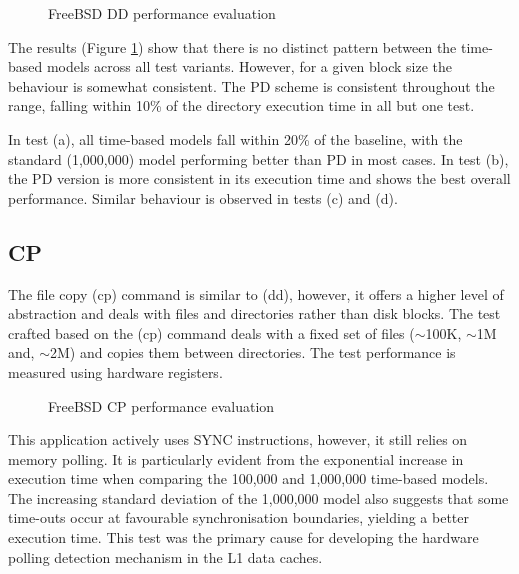 		\begin{figure}[!t]
		\centering 
			\caption{FreeBSD DD performance evaluation} 
			\label{dd_freebsd_full}
		\end{figure}
		
		The results (Figure \ref{dd_freebsd_full}) show that there is no distinct pattern between the time-based models across all test variants. However, for a given block size the behaviour is somewhat consistent. The PD scheme is consistent throughout the range, falling within 10\% of the directory execution time in all but one test.
		
		In test (a), all time-based models fall within 20\% of the baseline, with the standard (1,000,000) model performing better than PD in most cases. In test (b), the PD version is more consistent in its execution time and shows the best overall performance. Similar behaviour is observed in tests (c) and (d). 



	\subsection{CP}
		\label{results_cp}
		The file copy (cp) command is similar to (dd), however, it offers a higher level of abstraction and deals with files and directories rather than disk blocks. The test crafted based on the (cp) command deals with a fixed set of files ($\sim$100K, $\sim$1M and, $\sim$2M) and copies them between directories. The test performance is measured using hardware registers.
		
		\begin{figure}[!ht]
		\centering 
			\caption{FreeBSD CP performance evaluation} 
			\label{cp_freebsd_full}
		\end{figure}
		
		This application actively uses SYNC instructions, however, it still relies on memory polling. It is particularly evident from the exponential increase in execution time when comparing the 100,000 and 1,000,000 time-based models. The increasing standard deviation of the 1,000,000 model also suggests that some time-outs occur at favourable synchronisation boundaries, yielding a better execution time. This test was the primary cause for developing the hardware polling detection mechanism in the L1 data caches.
		

